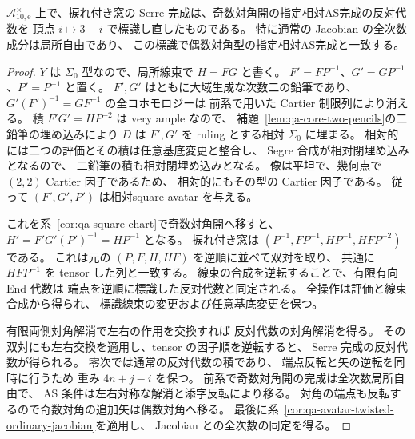 \begin{corollary}[偶数対角開での逆順双対と全次数比較]
\label{cor:qa-avatar-even-as-jacobian}
$\mathcal A_{10,\mathrm e}^{\times}$ 上で、捩れ付き窓の
Serre 完成は、奇数対角開の指定相対AS完成の反対代数を
頂点 $i\mapsto3-i$ で標識し直したものである。
特に通常の Jacobian の全次数成分は局所自由であり、
この標識で偶数対角型の指定相対AS完成と一致する。
\end{corollary}
\begin{proof}
$Y$ は $\Sigma_0$ 型なので、局所線束で $H=FG$ と書く。
$F'=FP^{-1}$、$G'=GP^{-1}$、$P'=P^{-1}$ と置く。
$F',G'$ はともに大域生成な次数二の鉛筆であり、
$G'(F')^{-1}=GF^{-1}$ の全コホモロジーは
前系で用いた Cartier 制限列により消える。
積 $F'G'=HP^{-2}$ は very ample なので、
補題~\ref{lem:qa-core-two-pencils}の二鉛筆の埋め込みにより
$D$ は $F',G'$ を ruling とする相対 $\Sigma_0$ に埋まる。
相対的には二つの評価とその積は任意基底変更と整合し、
Segre 合成が相対閉埋め込みとなるので、
二鉛筆の積も相対閉埋め込みとなる。
像は平坦で、幾何点で $(2,2)$ Cartier 因子であるため、
相対的にもその型の Cartier 因子である。
従って $(F',G',P')$ は相対square avatar を与える。

これを系~\ref{cor:qa-square-chart}で奇数対角開へ移すと、
$H'=F'G'(P')^{-1}=HP^{-1}$ となる。
捩れ付き窓は
$(P^{-1},FP^{-1},HP^{-1},HFP^{-2})$ である。
これは元の $(P,F,H,HF)$ を逆順に並べて双対を取り、
共通に $HFP^{-1}$ を tensor した列と一致する。
線束の合成を逆転することで、有限有向 End 代数は
端点を逆順に標識した反対代数と同定される。
全操作は評価と線束合成から得られ、
標識線束の変更および任意基底変更を保つ。

有限両側対角解消で左右の作用を交換すれば
反対代数の対角解消を得る。
その双対にも左右交換を適用し、tensor の因子順を逆転すると、
Serre 完成の反対代数が得られる。
零次では通常の反対代数の積であり、
端点反転と矢の逆転を同時に行うため
重み $4n+j-i$ を保つ。
前系で奇数対角開の完成は全次数局所自由で、
AS 条件は左右対称な解消と添字反転により移る。
対角の端点も反転するので奇数対角の追加矢は偶数対角へ移る。
最後に系~\ref{cor:qa-avatar-twisted-ordinary-jacobian}を適用し、
Jacobian との全次数の同定を得る。
\end{proof}

